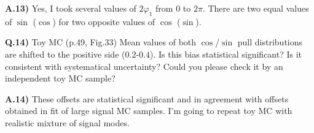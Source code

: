 \documentclass[a4paper,12pt]{article}
\begin{document}
{\bf A.13)} Yes, I took several values of $2\varphi_1$ from $0$ to $2\pi$. There are two equal values of $\sin$ ($\cos$) for two opposite values of $\cos$ ($\sin$).

{\bf Q.14)} Toy MC (p.49, Fig.33)
Mean values of both  $\cos$/$\sin$ pull distributions are shifted to the positive side ($0.2$-$0.4$). Is this bias statistical significant? Is it consistent with systematical uncertainty?
Could you please check it by an independent toy MC sample?

{\bf A.14)} These offsets are statistical significant and in agreement with offsets obtained in fit of large signal MC samples. I'm going to repeat toy MC with realistic mixture of signal modes.
\end{document}
